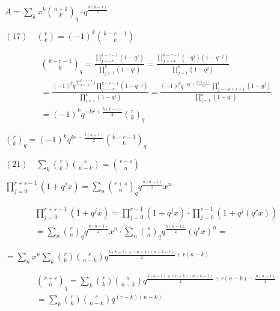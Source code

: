 \documentclass{article}
\begin{document}
\( A = \sum_{k} x^{k} \binom{n+1}{k}_{q} \cdot q^{\frac{k(k-1)}{2}} \)

\( (17)\quad \binom{r}{k} = {(-1)}^{k} \binom{k-r-1}{k} \)

\begin{multline*}
\binom{k-r-1}{k}_{q} = \frac{\prod_{j=-r}^{k-r-1} (1-q^{j})}{\prod_{j=1}^{k} (1-q^{j})} = \frac{\prod_{j=-r}^{k-r-1} (-q^{j})(1-q^{-j})}{\prod_{j=1}^{k} (1-q^{j})} \\
= \frac{{(-1)}^{k}q^{\sum_{j=-r}^{k-r-1} j}\prod_{j=-r}^{k-r-1} (1-q^{-j})}{\prod_{j=1}^{k} (1-q^{j})} = \frac{{(-1)}^{k}q^{-kr + \frac{k(k-1)}{2}}\prod_{j=-k+r+1}^{r} (1-q^{j})}{\prod_{j=1}^{k} (1-q^{j})} \\
= {(-1)}^{k}q^{-kr + \frac{k(k-1)}{2}} \binom{r}{k}_{q}
\end{multline*}

\( \binom{r}{k}_{q} = {(-1)}^{k}q^{kr - \frac{k(k-1)}{2}} \binom{k-r-1}{k}_{q} \)

\( (21)\quad \sum_{k}\binom{r}{k}\binom{s}{n-k} = \binom{r+s}{n} \)

\( \prod_{j=0}^{r+s-1} (1 + q^{j} x) = \sum_{n} \binom{r+s}{n}_{q} q^{\frac{n(n-1)}{2}} x^{n} \)

\begin{multline*}
\prod_{j=0}^{r+s-1} (1 + q^{j} x) = \prod_{j=0}^{r-1} (1 + q^{j} x) \cdot \prod_{j=0}^{s-1} (1 + q^{j} (q^{r} x)) \\
= \sum_{n} \binom{r}{n}_{q} q^{\frac{n(n-1)}{2}} x^{n} \cdot \sum_{n} \binom{s}{n}_{q} q^{\frac{n(n-1)}{2}} {(q^{r}x)}^{n} =
\end{multline*}

\( = \sum_{n} x^{n} \sum_{k} \binom{r}{k}\binom{s}{n-k}q^{\frac{k(k-1) + (n-k)(n-k-1)}{2} + r(n-k)} \)

\begin{multline*}
\binom{r+s}{n}_{q} = \sum_{k} \binom{r}{k}\binom{s}{n-k}q^{\frac{k(k-1) + (n-k)(n-k-1)}{2} + r(n-k) - \frac{n(n-1)}{2}} \\
= \sum_{k} \binom{r}{k}\binom{s}{n-k}q^{(r-k)(n-k)}
\end{multline*}
\end{document}
